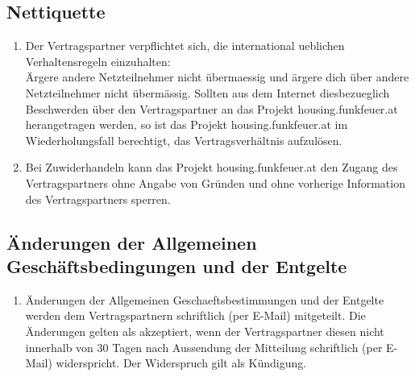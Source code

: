 \documentclass[parskip=half]{article}
\begin{document}
\subsection{Nettiquette}
\begin{enumerate}
\item Der Vertragspartner verpflichtet sich, die international ueblichen Verhaltensregeln einzuhalten: \\
Ärgere andere Netzteilnehmer nicht übermaessig und ärgere dich über andere
Netzteilnehmer nicht übermässig. Sollten aus dem Internet diesbezueglich Beschwerden über
den Vertragspartner an das Projekt housing.funkfeuer.at herangetragen werden, so ist das Projekt
housing.funkfeuer.at im Wiederholungsfall berechtigt, das Vertragsverhältnis aufzulösen.
\item Bei Zuwiderhandeln kann das Projekt housing.funkfeuer.at den Zugang des
Vertragspartners ohne Angabe von Gründen und ohne vorherige Information des
Vertragspartners sperren.
\end{enumerate}

\subsection{ Änderungen der Allgemeinen Geschäftsbedingungen und der Entgelte}
\begin{enumerate}
\item[] Änderungen der Allgemeinen Geschaeftsbestimmungen und der Entgelte werden dem
Vertragspartnern schriftlich (per E-Mail) mitgeteilt. Die Änderungen gelten als akzeptiert,
wenn der Vertragspartner diesen nicht innerhalb von 30 Tagen nach Aussendung der
Mitteilung schriftlich (per E-Mail) widerspricht. Der Widerspruch gilt als Kündigung.
\end{enumerate}
\end{document}
